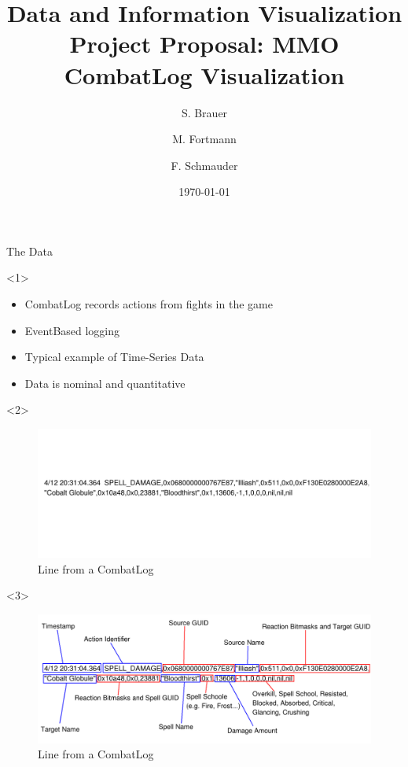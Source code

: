\documentclass{beamer}
\title[Project Proposal]{Data and Information Visualization \\ Project Proposal: MMO CombatLog Visualization}
\author[Brauer, Fortmann, Schmauder]
{S. Brauer \and M. Fortmann \and F. Schmauder}
\institute[UPB]{Institute for Computer Science}
\date{\today}
\begin{document}
\begin{frame}
  \titlepage
\end{frame}

\begin{frame}{The Data}
\begin{onlyenv}<1>
	\begin{itemize}
		\item CombatLog records actions from fights in the game
		\item EventBased logging
		\item Typical example of Time-Series Data
		\item Data is nominal \alert{and} quantitative
	\end{itemize}
\end{onlyenv}
\begin{onlyenv}<2>
	\begin{figure}
		\includegraphics[width=\textwidth]{log_undecorated.png}
		\caption{Line from a CombatLog}
	\end{figure}
\end{onlyenv}
\begin{onlyenv}<3>
	\begin{figure}
		\includegraphics[width=\textwidth]{log_decorated.png}
		\caption{Line from a CombatLog}
	\end{figure}
\end{onlyenv}
\end{frame}
\end{document}
